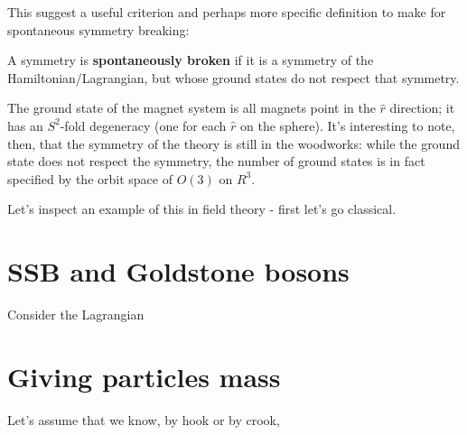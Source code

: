 \documentclass[main.tex]{subfiles}
\begin{document}
This suggest a useful criterion and perhaps more specific definition to make for spontaneous symmetry breaking:
\begin{defn} \label{ssb2}
A symmetry is \textbf{spontaneously broken} if it is a symmetry of the Hamiltonian/Lagrangian, but whose ground states do not respect that symmetry.
\end{defn}
The ground state of the magnet system is all magnets point in the $\hat{r}$ direction; it has an $S^2$-fold degeneracy (one for each $\hat{r}$ on the sphere). It's interesting to note, then, that the symmetry of the theory is still in the woodworks: while the ground state does not respect the symmetry, the number of ground states is in fact specified by the orbit space of $O(3)$ on $R^3$.

Let's inspect an example of this in field theory - first let's go classical. 

\section{SSB and Goldstone bosons}

Consider the Lagrangian 

\section{Giving particles mass}
Let's assume that we know, by hook or by crook, 
\end{document}

